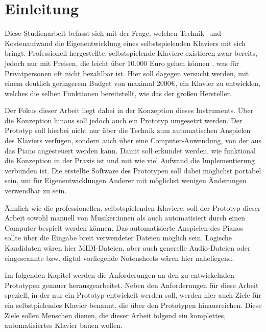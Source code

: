 
\chapter{Einleitung} \label{einleitung}

Diese Studienarbeit befasst sich mit der Frage, welchen Technik- und Kostenaufwand die Eigenentwicklung eines selbstspielenden Klaviers mit sich bringt. %
Professionell hergestellte, selbstspielende Klaviere existieren zwar bereits,
jedoch nur mit Preisen, die leicht über 10.000 Euro gehen können \cite{YamahaU1}, was für Privatpersonen oft nicht bezahlbar ist.
Hier soll dagegen versucht werden, mit einem deutlich geringerem Budget von maximal 2000€, ein Klavier zu entwicklen, welches die selben Funktionen bereitstellt, wie das der großen Hersteller.


Der Fokus dieser Arbeit liegt dabei in der Konzeption dieses Instruments.
Über die Konzeption hinaus soll jedoch auch ein Prototyp umgesetzt werden.
Der Prototyp soll hierbei nicht nur über die Technik zum automatischen Anspielen des Klaviers verfügen, sondern auch über eine Computer-Anwendung, von der aus das Piano angesteuert werden kann.
Damit soll erkundet werden, wie funktional die Konzeption in der Praxis ist und mit wie viel Aufwand die Implementierung verbunden ist.
Die erstellte Software des Prototypen soll dabei möglichst portabel sein, um für Eigenentwicklungen Anderer mit möglichst wenigen Änderungen verwendbar zu sein.

Ähnlich wie die professionellen, selbstspielenden Klaviere, soll der Prototyp dieser Arbeit sowohl manuell von Musiker:innen als auch automatisiert durch einen Computer bespielt werden können.
Das automatisierte Anspielen des Pianos sollte über die Eingabe breit verwendeter Dateien möglich sein.
Logische Kandidaten wären hier \ac{MIDI}-Dateien, aber auch generelle Audio-Dateien oder eingescannte bzw. digtal vorliegende Notensheets wären hier naheliegend.

Im folgenden Kapitel werden die Anforderungen an den zu entwickelnden Prototypen genauer herausgearbeitet.
Neben den Anforderungen für diese Arbeit speziell, in der nur ein Prototyp entwickelt werden soll,
werden hier auch Ziele für ein selbstpielendes Klavier benannt, die über den Prototypen hinausreichen.
Diese Ziele sollen Menschen dienen, die dieser Arbeit folgend ein komplettes, automatisiertes Klavier bauen wollen.

